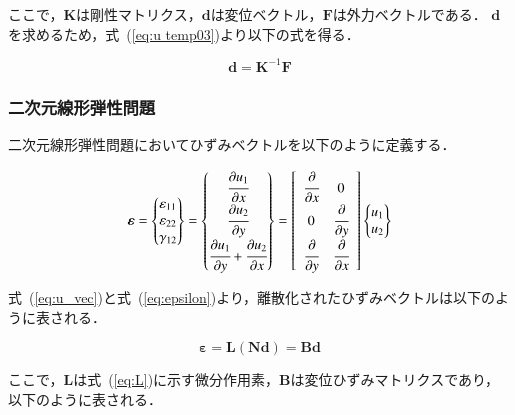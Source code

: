 \noindent
ここで，$\boldsymbol{K}$は剛性マトリクス，$\boldsymbol{d}$は変位ベクトル，$\boldsymbol{F}$は外力ベクトルである．
$\boldsymbol{d}$を求めるため，式~(\ref{eq:u temp03})より以下の式を得る．

\begin{equation}
  \boldsymbol{d} = \boldsymbol{K}^{-1}\boldsymbol{F}
\end{equation}

\newpage

\subsubsection{二次元線形弾性問題}
二次元線形弾性問題においてひずみベクトルを以下のように定義する．

\begin{equation}
  \label{eq:epsilon}
  \boldsymbol{\varepsilon}=
    \begin{Bmatrix}
      \varepsilon_{11}\\
      \varepsilon_{22}\\
      \gamma_{12}
    \end{Bmatrix}=
    \begin{Bmatrix}
      \cfrac{\partial u_1}{\partial x}\\
      \cfrac{\partial u_2}{\partial y}\\
      \cfrac{\partial u_1}{\partial y}+\cfrac{\partial u_2}{\partial x}
    \end{Bmatrix}=
    \left[
      \begin{array}{cc}
        \cfrac{\partial}{\partial x} & 0\\
        0 & \cfrac{\partial}{\partial y}\\
        \cfrac{\partial}{\partial y} & \cfrac{\partial}{\partial x}
      \end{array}
    \right]
    \begin{Bmatrix}
      u_1\\
      u_2
    \end{Bmatrix}
\end{equation}

\noindent
式~(\ref{eq:u_vec})と式~(\ref{eq:epsilon})より，離散化されたひずみベクトルは以下のように表される．

\begin{equation}
  \boldsymbol{\varepsilon} = \boldsymbol{L}(\boldsymbol{N}\boldsymbol{d})=\boldsymbol{B}\boldsymbol{d}
\end{equation}

\noindent
ここで，$\boldsymbol{L}$は式~(\ref{eq:L})に示す微分作用素，$\boldsymbol{B}$は変位ひずみマトリクスであり，以下のように表される．


